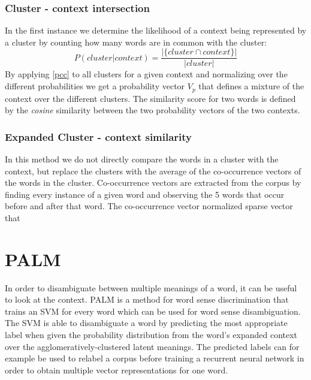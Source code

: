 \documentclass[11pt]{article}
\begin{document}
\subsubsection{Cluster - context intersection}
In the first instance we determine the likelihood of a context being represented by a cluster by counting how many words are in common with the cluster:
\begin{equation} \label{pcc}P( \textit{cluster} | \textit{context}) = \frac{ | \{\textit{cluster} \cap \textit{context}\} |  }{| \textit{cluster} |} \end{equation}
By applying \ref{pcc} to all clusters for a given context and normalizing over the different probabilities we get a probability vector $V_{p}$ that defines a mixture of the context over the different clusters. The similarity score for two words is defined by the \textit{cosine} similarity between the two probability vectors of the two contexts.

\subsubsection{Expanded Cluster - context similarity}
In this method we do not directly compare the words in a cluster with the context, but replace the clusters with the average of the co-occurrence vectors of the words in the cluster. Co-occurrence vectors are extracted from the corpus by finding every instance of a given word and observing the 5 words that occur before and after that word. The co-occurrence vector normalized sparse vector that 

\section{PALM}
In order to disambiguate between multiple meanings of a word, it can be useful to look at the context. PALM is a method for word sense discrimination that trains an SVM for every word which can be used for word sense disambiguation. The SVM is able to disambiguate a word by predicting the most appropriate label when given the probability distribution from the word's expanded context over the agglomeratively-clustered latent meanings. The predicted labels can for example be used to relabel a corpus before training a recurrent neural network in order to obtain multiple vector representations for one word. 
\end{document}
